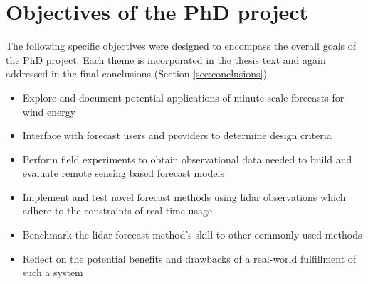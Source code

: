 \chapter{Objectives of the PhD project}
\label{sec:objectives}

The following specific objectives were designed to encompass the overall goals of the PhD project. Each theme is incorporated in the thesis text and again addressed in the final conclusions (Section \ref{sec:conclusions}).

\vspace{0.5cm}

\begin{itemize}
    \item Explore and document potential applications of minute-scale forecasts for wind energy
    \item Interface with forecast users and providers to determine design criteria
    \item Perform field experiments to obtain observational data needed to build and evaluate remote sensing based forecast models
    \item Implement and test novel forecast methods using lidar observations which adhere to the constraints of real-time usage
    \item Benchmark the lidar forecast method's skill to other commonly used methods
    \item Reflect on the potential benefits and drawbacks of a real-world fulfillment of such a system
\end{itemize}